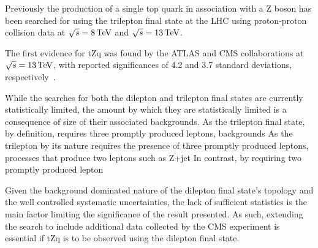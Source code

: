 Previously the production of a single top quark in association with a Z boson has been searched for using the trilepton final state at the LHC using proton-proton collision data at $\sqrt{s} = 8 \,\text{Te\hspace{-.08em}V}$ and $\sqrt{s} = 13 \,\text{Te\hspace{-.08em}V}$.

The first evidence for tZq was found by the ATLAS and CMS collaborations at $\sqrt{s} = 13 \,\text{Te\hspace{-.08em}V}$, with reported significances of 4.2 and 3.7 standard deviations, respectively~\cite{Aaboud:2017ylb,Sirunyan:2017nbr}.

While the searches for both the dilepton and trilepton final states are currently statistically limited, the amount by which they are statistically limited is a consequence of size of their associated backgrounds.
As the trilepton final state, by definition, requires three promptly produced leptons, backgrounds 
As the trilepton  by its nature requires the presence of three promptly produced leptons, processes that produce two leptons such as Z+jet
In contrast, by requiring two promptly produced lepton 


Given the background dominated nature of the dilepton final state's topology and the well controlled systematic uncertainties, the lack of sufficient statistics is the main factor limiting the significance of the result presented.
As such, extending the search to include additional data collected by the CMS experiment is essential if tZq is to be observed using the dilepton final state.
